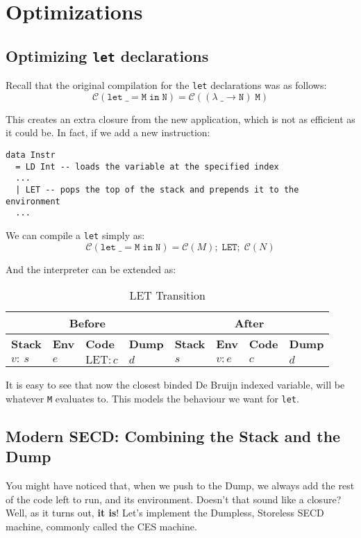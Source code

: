\section{Optimizations}
\subsection{Optimizing \texttt{let} declarations}
Recall that the original compilation for the \texttt{let} declarations was as follows:
\[ \mathcal{C}(\mathtt{let\; \_ = M\; in\; N}) = \mathcal{C}((\lambda\; \_ \to \mathtt{N})\; \mathtt{M}) \]

This creates an extra closure from the new application, which is not as efficient as it could be.
In fact, if we add a new instruction:
\begin{lstlisting}
data Instr
  = LD Int -- loads the variable at the specified index 
  ...
  | LET -- pops the top of the stack and prepends it to the environment
  ...
\end{lstlisting}

We can compile a \texttt{let} simply as:
\[ \mathcal{C}(\mathtt{let\; \_ = M\; in\; N}) = \mathcal{C}(M);\; \texttt{LET};\; \mathcal{C}(N) \]

And the interpreter can be extended as:

\begin{table}[h]
    \centering
    \small
    \setlength{\tabcolsep}{4pt}
    \begin{tabular}{|l|l|l|l||l|l|l|l|}
        \hline
        \multicolumn{4}{|c||}{\textbf{Before}} & \multicolumn{4}{c|}{\textbf{After}} \\
        \hline
        \textbf{Stack} & \textbf{Env} & \textbf{Code} & \textbf{Dump} & \textbf{Stack} & \textbf{Env} & \textbf{Code} & \textbf{Dump} \\
        \hline
        \( v : \ s \) & \( e \) & \( \text{LET} : c \) & \( d \) & \( s \) & \( v : e \) & \( c \) & \( d \) \\
        \hline
    \end{tabular}
    \caption{LET Transition}
\end{table}

It is easy to see that now the closest binded De Bruijn indexed variable, will be whatever \texttt{M} evaluates to. 
This models the behaviour we want for \texttt{let}.

\subsection{Modern SECD: Combining the Stack and the Dump}
You might have noticed that, when we push to the Dump, we always add the rest of the code left to run, and its environment. 
Doesn't that sound like a closure? Well, as it turns out, \textbf{it is}!
Let's implement the Dumpless, Storeless SECD machine, commonly called the CES machine.

